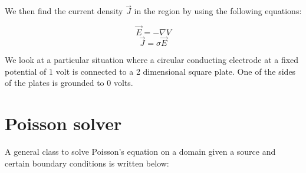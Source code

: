 \documentclass[11pt]{article}
\begin{document}
We then find the current density \(\vec{J}\) in the region by using the
following equations:

\[\vec{E} = -\nabla V\] \[\vec{J} = \sigma \vec{E}\]

We look at a particular situation where a circular conducting electrode
at a fixed potential of \(1\) volt is connected to a 2 dimensional
square plate. One of the sides of the plates is grounded to \(0\) volts.

	

	

	

	
		
    \section{Poisson solver}\label{poisson-solver}

A general class to solve Poisson's equation on a domain given a source
and certain boundary conditions is written below:

	

	
		
\end{document}
